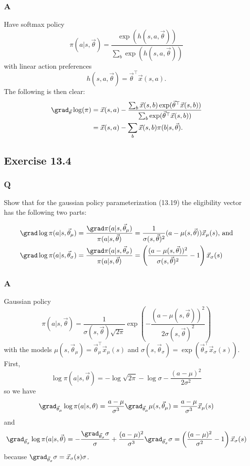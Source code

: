 \subsubsection*{A}
Have softmax policy
\[
    \pi(a \vert{} s, \vec{\theta}) = \frac{\exp(h(s, a, \vec{\theta}))}{\sum_b \exp(h(s, a, \vec{\theta}))}
\]
with linear action preferences 
\[
    h(s, a, \vec{\theta}) = \vec{\theta}^\top \vec{x}(s, a).
\]
The following is then clear:
\begin{align*}
    \grad_{\vec{\theta}} \log(\pi) &= \vec{x}(s, a) - \frac{\sum_b \vec{x}(s, b) \exp(\vec{\theta}^\top \vec{x}(s, b))}{\sum_b \exp(\vec{\theta}^\top \vec{x}(s, b))} \\
                                   &= \vec{x}(s, a) - \sum_b \vec{x}(s, b) \pi(b \vert{} s, \vec{\theta}).
\end{align*}

\subsection{Exercise 13.4}
\subsubsection*{Q}
Show that for the gaussian policy parameterization (13.19) the eligibility vector has the following two parts:

\begin{align*}
    \grad \log \pi(a \vert{} s, \vec{\theta}_\mu) &= \frac{\grad \pi(a \vert{} s, \vec{\theta}_\mu)}{\pi(a \vert{} s, \vec{\theta})} = \frac{1}{\sigma(s, \vec{\theta})^2} (a - \mu(s, \vec{\theta}))\vec{x}_\mu(s)\text{, and}\\
    \grad \log \pi(a \vert{} s, \vec{\theta}_\sigma) &= \frac{\grad \pi(a \vert{} s, \vec{\theta}_\sigma)}{\pi(a \vert{} s, \vec{\theta})} = \left( \frac{(a - \mu(s, \vec{\theta}))^2}{\sigma(s, \vec{\theta})^2} - 1 \right) \vec{x}_\sigma(s)
\end{align*}

\subsubsection*{A}
Gaussian policy
\[
    \pi(a \vert{} s, \vec{\theta}) = \frac{1}{\sigma(s, \vec{\theta}) \sqrt{2 \pi}} \exp\left( - \frac{(a - \mu(s, \vec{\theta}))^2}{2 \sigma(s, \vec{\theta})^2} \right)
\]
with the models $\mu(s, \vec{\theta}_\mu) = \vec{\theta}_\mu^\top\vec{x}_\mu(s)$ and $\sigma(s, \vec{\theta}_\sigma) = \exp(\vec{\theta}_\sigma^\top\vec{x}_\sigma(s))$. First,
\[
    \log \pi(a \vert{} s, \vec{\theta}) = - \log \sqrt{2 \pi} - \log \sigma - \frac{(a - \mu)^2}{2\sigma^2}
\]
so we have 
\[
    \grad_{\vec{\theta}_\mu}\log\pi(a \vert{}s, \theta) = \frac{a - \mu}{\sigma^3}\grad_{\vec{\theta}_\mu}\mu(s, \vec{\theta}_\mu) = \frac{a - \mu}{\sigma^3} \vec{x}_\mu(s)
\]
and
\[
    \grad_{\vec{\theta}_\sigma}\log\pi(a \vert{} s, \vec{\theta}) = - \frac{\grad_{\vec{\theta}_\sigma} \sigma}{\sigma} + \frac{(a - \mu)^2}{\sigma^3}\grad_{\vec{\theta}_\sigma}\sigma = \left( \frac{(a - \mu)^2}{\sigma^2} - 1 \right)\vec{x}_\sigma(s) 
\]
because $\grad_{\vec{\theta}_\sigma}\sigma = \vec{x}_\sigma(s) \sigma$.


